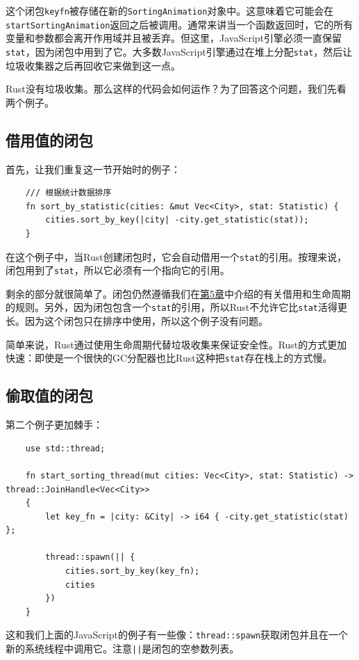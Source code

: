 这个闭包\texttt{keyfn}被存储在新的\texttt{SortingAnimation}对象中。这意味着它可能会在\\
\texttt{startSortingAnimation}返回之后被调用。通常来讲当一个函数返回时，它的所有变量和参数都会离开作用域并且被丢弃。但这里，JavaScript引擎必须一直保留\texttt{stat}，因为闭包中用到了它。大多数JavaScript引擎通过在堆上分配\texttt{stat}，然后让垃圾收集器之后再回收它来做到这一点。

Rust没有垃圾收集。那么这样的代码会如何运作？为了回答这个问题，我们先看两个例子。

\subsection{借用值的闭包}
首先，让我们重复这一节开始时的例子：
\begin{verbatim}
    /// 根据统计数据排序
    fn sort_by_statistic(cities: &mut Vec<City>, stat: Statistic) {
        cities.sort_by_key(|city| -city.get_statistic(stat));
    }
\end{verbatim}

在这个例子中，当Rust创建闭包时，它会自动借用一个\texttt{stat}的引用。按理来说，闭包用到了\texttt{stat}，所以它必须有一个指向它的引用。

剩余的部分就很简单了。闭包仍然遵循我们在\hyperref[ch05]{第5章}中介绍的有关借用和生命周期的规则。另外，因为闭包包含一个\texttt{stat}的引用，所以Rust不允许它比\texttt{stat}活得更长。因为这个闭包只在排序中使用，所以这个例子没有问题。

简单来说，Rust通过使用生命周期代替垃圾收集来保证安全性。Rust的方式更加快速：即使是一个很快的GC分配器也比Rust这种把\texttt{stat}存在栈上的方式慢。

\subsection{偷取值的闭包}\label{StealClosure}
第二个例子更加棘手：
\begin{verbatim}
    use std::thread;

    fn start_sorting_thread(mut cities: Vec<City>, stat: Statistic) -> thread::JoinHandle<Vec<City>>
    {
        let key_fn = |city: &City| -> i64 { -city.get_statistic(stat) };

        thread::spawn(|| {
            cities.sort_by_key(key_fn);
            cities
        })
    }
\end{verbatim}

这和我们上面的JavaScript的例子有一些像：\texttt{thread::spawn}获取闭包并且在一个新的系统线程中调用它。注意\texttt{||}是闭包的空参数列表。

